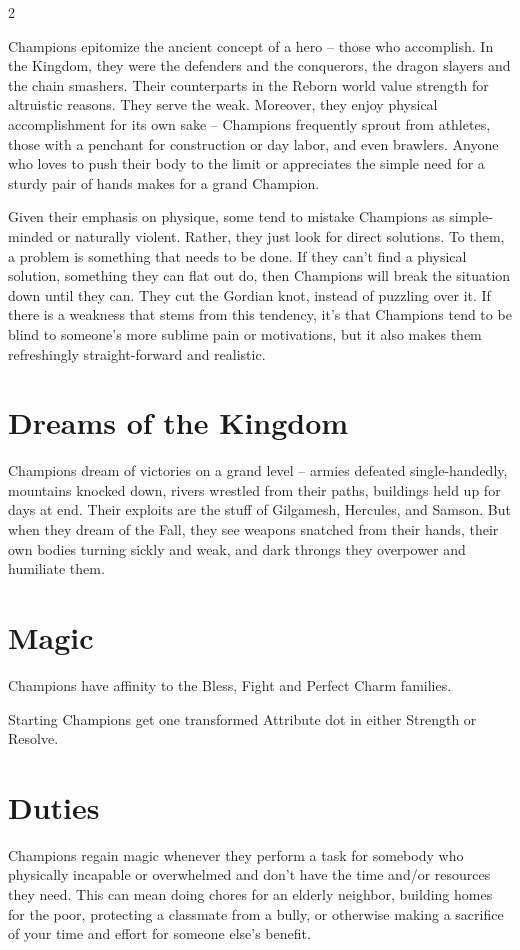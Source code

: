 \label{scha:Champion}\begin{multicols}{2}\raggedcolumns

\noindent Champions epitomize the ancient concept of a hero -- those who accomplish. In the Kingdom, they were the defenders and the conquerors, the dragon slayers and the chain smashers. Their counterparts in the Reborn world value strength for altruistic reasons. They serve the weak. Moreover, they enjoy physical accomplishment for its own sake -- Champions frequently sprout from athletes, those with a penchant for construction or day labor, and even brawlers. Anyone who loves to push their body to the limit or appreciates the simple need for a sturdy pair of hands makes for a grand Champion.

Given their emphasis on physique, some tend to mistake Champions as simple-minded or naturally violent. Rather, they just look for direct solutions. To them, a problem is something that needs to be done. If they can't find a physical solution, something they can flat out do, then Champions will break the situation down until they can. They cut the Gordian knot, instead of puzzling over it. If there is a weakness that stems from this tendency, it's that Champions tend to be blind to someone's more sublime pain or motivations, but it also makes them refreshingly straight-forward and realistic. 

\section*{Dreams of the Kingdom}

Champions dream of victories on a grand level -- armies defeated single-handedly, mountains knocked down, rivers wrestled from their paths, buildings held up for days at end. Their exploits are the stuff of Gilgamesh, Hercules, and Samson. But when they dream of the Fall, they see weapons snatched from their hands, their own bodies turning sickly and weak, and dark throngs they overpower and humiliate them. 

\section*{Magic}
Champions have affinity to the Bless, Fight and Perfect Charm families.

Starting Champions get one transformed Attribute dot in either Strength or Resolve. 

\section*{Duties}
Champions regain magic whenever they perform a task for somebody who physically incapable or overwhelmed and don't have the time and/or resources they need. This can mean doing chores for an elderly neighbor, building homes for the poor, protecting a classmate from a bully, or otherwise making a sacrifice of your time and effort for someone else's benefit. 


\end{multicols}
